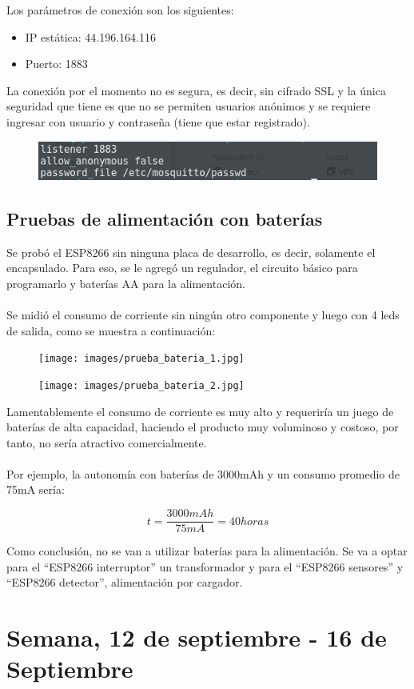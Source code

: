 \documentclass[oneside]{article}
\begin{document}
Los parámetros de conexión son los siguientes:
\begin{itemize}
\item IP estática: 44.196.164.116
\item Puerto: 1883
\end{itemize}


La conexión por el momento no es segura, es decir, sin cifrado SSL y la única seguridad que tiene es que no se permiten usuarios anónimos y se requiere ingresar con usuario y contraseña (tiene que estar registrado).
\begin{figure}[H]
\centering
\includegraphics[scale=1]{images/conf_inicial_broker.jpg}
\end{figure}

\subsection*{Pruebas de alimentación con baterías}
Se probó el ESP8266 sin ninguna placa de desarrollo, es decir, solamente el encapsulado. Para eso, se le agregó un regulador, el circuito básico para programarlo y baterías AA para la alimentación.\\\\
Se midió el consumo de corriente sin ningún otro componente y luego con 4 leds de salida, como se muestra a continuación:
	
\begin{figure}[H]
\centering
\texttt{[image: images/prueba\_bateria\_1.jpg]}
\end{figure}

\begin{figure}[H]
\centering
\texttt{[image: images/prueba\_bateria\_2.jpg]}
\end{figure}

Lamentablemente el consumo de corriente es muy alto y requeriría un juego de baterías de alta capacidad, haciendo el producto muy voluminoso y costoso, por tanto, no sería atractivo comercialmente. 
\\\\
Por ejemplo, la autonomía con baterías de 3000mAh y un consumo promedio de 75mA sería:

$$t = \frac{3000mAh}{75mA}=40horas$$

Como conclusión, no se van a utilizar baterías para la alimentación. Se va a optar para el ``ESP8266 interruptor'' un transformador y para el ``ESP8266 sensores'' y ``ESP8266 detector'', alimentación por cargador.

\newpage
\section*{Semana, 12 de septiembre - 16 de Septiembre}


  
\end{document}
